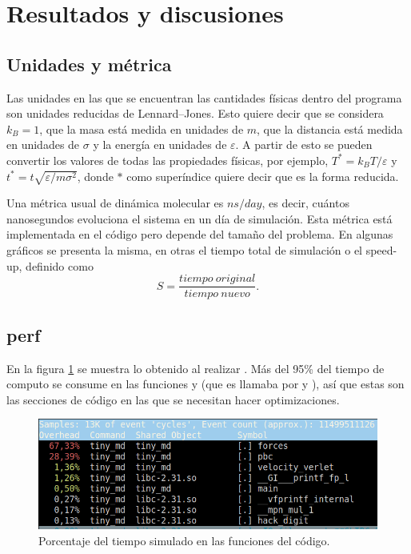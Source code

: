 \documentclass[a4paper,spanish,12pt,twoside]{article}
\begin{document}
\section{Resultados y discusiones}

\subsection*{Unidades y métrica}

Las unidades en las que se encuentran las cantidades físicas dentro del programa son unidades reducidas de Lennard--Jones. Esto quiere decir que se considera $k_B = 1$, que la masa está medida en unidades de $m$, que la distancia está medida en unidades de $\sigma$ y la energía en unidades de $\varepsilon$. A partir de esto se pueden convertir los valores de todas las propiedades físicas, por ejemplo, $T^* = k_BT/\varepsilon$ y $t^* = t \sqrt{\varepsilon/m\sigma^2}$, donde $*$ como superíndice quiere decir que es la forma reducida.

Una métrica usual de dinámica molecular es $ns/day$, es decir, cuántos nanosegundos evoluciona el sistema en un día de simulación. Esta métrica está implementada en el código pero depende del tamaño del problema. En algunas gráficos se presenta la misma, en otras el tiempo total de simulación o el speed-up, definido como
\begin{equation}\label{eq:su}
	S = \frac{tiempo\ original}{tiempo\ nuevo}.
\end{equation}


\subsection*{perf}

En la figura \ref{fig:perf-report} se muestra lo obtenido al realizar . Más del 95\% del tiempo de computo se consume en las funciones  y  (que es llamaba por  y ), así que estas son las secciones de código en las que se necesitan hacer optimizaciones.
\begin{figure}[h]
	\centering
	\includegraphics[width=.7\textwidth]{perf-report.png}
	\caption{Porcentaje del tiempo simulado en las funciones del código.}
	\label{fig:perf-report}
\end{figure}
\end{document}
